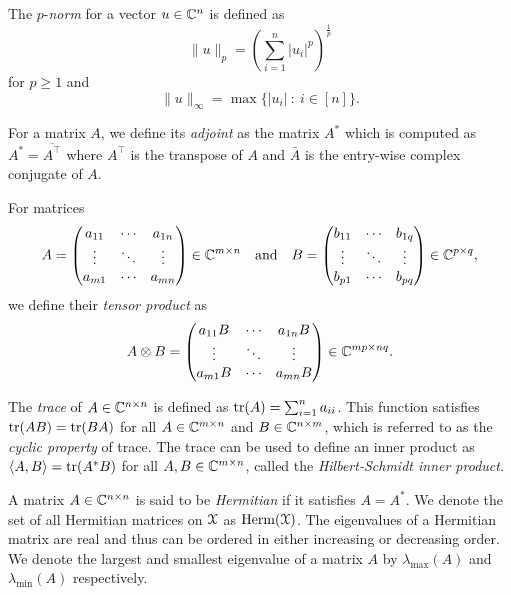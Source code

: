 The $p$-\emph{norm} for a vector $u \in \mathbb{C}^n$ is defined as
\begin{equation}
    \|u\|_p = \left( \sum_{i=1}^n |u_i|^p \right)^{\frac{1}{p}}
\end{equation}
for $p \geq 1$ and
\begin{equation}
    \|u\|_\infty = \max \{ |u_i|\ :\ i \in [n] \}.
\end{equation}

For a matrix $A$, we define its \emph{adjoint} as the matrix $A^*$ which is computed as $A^* = \overline{A^\top}$ where $A^\top$ is the transpose of $A$ and $\bar{A}$ is the entry-wise complex conjugate of $A$.

For matrices
\begin{equation*}
    A = \begin{pmatrix}
        a_{11} & \cdots & a_{1n} \\
        \vdots & \ddots & \vdots \\
        a_{m1} & \cdots & a_{mn}
    \end{pmatrix} \in \mathbb{C}^{m \times n}
    \quad \text{and} \quad
    B = \begin{pmatrix}
        b_{11} & \cdots & b_{1q} \\
        \vdots & \ddots & \vdots \\
        b_{p1} & \cdots & b_{pq}
    \end{pmatrix} \in \mathbb{C}^{p \times q},
\end{equation*}
we define their \emph{tensor product} as
\begin{equation}
    A \otimes B = \begin{pmatrix}
        a_{11} B & \cdots & a_{1n} B \\
        \vdots & \ddots & \vdots \\
        a_{m1} B & \cdots & a_{mn} B
    \end{pmatrix} \in \mathbb{C}^{mp \times nq}.
\end{equation}

The \emph{trace} of $A \in \mathbb{C}^{n \times n}$ is defined as $\tr(A) = \sum_{i=1}^n a_{ii}$.
This function satisfies $\tr(AB) = \tr(BA)$ for all $A \in \mathbb{C}^{m \times n}$ and $B \in \mathbb{C}^{n \times m}$, which is referred to as the \emph{cyclic property} of trace.
The trace can be used to define an inner product as $\left\langle A, B \right\rangle = \tr(A^* B)$ for all $A, B \in \mathbb{C}^{m \times n}$, called the \emph{Hilbert-Schmidt inner product}.

A matrix $A \in \mathbb{C}^{n \times n}$ is said to be \emph{Hermitian} if it satisfies $A = A^*$.
We denote the set of all Hermitian matrices on $\mathcal{X}$ as $\operatorname{Herm}(\mathcal{X})$.
The eigenvalues of a Hermitian matrix are real and thus can be ordered in either increasing or decreasing order.
We denote the largest and smallest eigenvalue of a matrix $A$ by $\lambda_{\mathrm{max}}(A)$ and $\lambda_{\mathrm{min}}(A)$ respectively.

